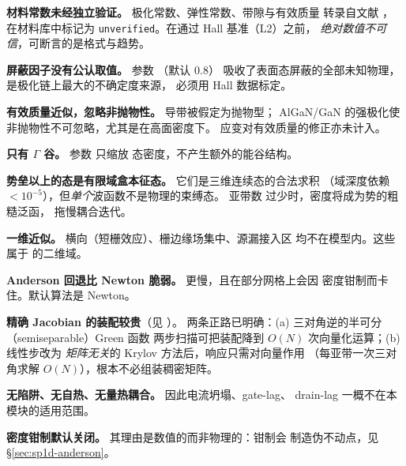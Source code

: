 \begin{bounds}
  \item \textbf{材料常数未经独立验证。} 极化常数、弹性常数、带隙与有效质量
        转录自文献 \cite{ambacher2000,vurgaftman2003,bernardini1997,dreyer2016}，
        在材料库中标记为 \texttt{unverified}。在通过 Hall 基准（L2）之前，
        \emph{绝对数值不可信}，可断言的是格式与趋势。

  \item \textbf{屏蔽因子没有公认取值。} 参数 （默认 $0.8$）
        吸收了表面态屏蔽的全部未知物理，是极化链上最大的不确定度来源，
        必须用 Hall 数据标定。

  \item \textbf{有效质量近似，忽略非抛物性。} 导带被假定为抛物型；
        AlGaN/GaN 的强极化使非抛物性不可忽略，尤其是在高面密度下。
        应变对有效质量的修正亦未计入。

  \item \textbf{只有 $\Gamma$ 谷。} 参数  只缩放
        态密度，不产生额外的能谷结构。

  \item \textbf{势垒以上的态是有限域盒本征态。} 它们是三维连续态的合法求积
        （域深度依赖 $<10^{-5}$），但\emph{单个}波函数不是物理的束缚态。
        亚带数  过少时，密度将成为势的粗糙泛函，
        拖慢耦合迭代。

  \item \textbf{一维近似。} 横向（短栅效应）、栅边缘场集中、源漏接入区
        均不在模型内。这些属于  的二维域。

  \item \textbf{Anderson 回退比 Newton 脆弱。} 更慢，且在部分网格上会因
        密度钳制而卡住。默认算法是 Newton。

  \item \textbf{精确 Jacobian 的装配较贵}（见 ）。
        两条正路已明确：(a) 三对角逆的半可分（semiseparable）Green 函数
        两步扫描可把装配降到 $O(N)$ 次向量化运算；(b) 线性步改为
        \emph{矩阵无关}的 Krylov 方法后，响应只需对向量作用
        （每亚带一次三对角求解 $O(N)$），根本不必组装稠密矩阵。

  \item \textbf{无陷阱、无自热、无量热耦合。} 因此电流坍塌、gate-lag、
        drain-lag 一概不在本模块的适用范围。

  \item \textbf{密度钳制默认关闭。} 其理由是数值的而非物理的：钳制会
        制造伪不动点，见 \S\ref{sec:sp1d-anderson}。
\end{bounds}

